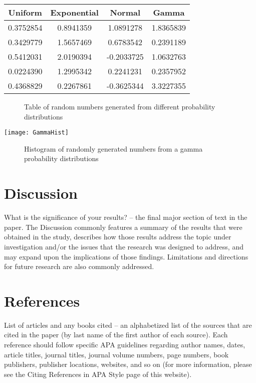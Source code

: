 \documentclass[12pt, letterpaper, twoside]{article}
\begin{document}
\begin{center}
\begin{tabular}{||c c c c||} 
 \hline
 Uniform & Exponential & Normal & Gamma \\ [0.5ex] 
 \hline\hline
 0.3752854 & 0.8941359 & 1.0891278 & 1.8365839 \\ 
 \hline
 0.3429779 & 1.5657469 & 0.6783542 & 0.2391189 \\
 \hline
 0.5412031 & 2.0190394 & -0.2033725 & 1.0632763 \\
 \hline
 0.0224390 & 1.2995342 & 0.2241231 & 0.2357952 \\
 \hline
 0.4368829 & 0.2267861 & -0.3625344 & 3.3227355 \\ [1ex] 
 \hline
\end{tabular}
\end{center}

\begin{figure}[h]
  \centering
  \caption{Table of random numbers generated from different probability distributions}
  \label{fig:Random Variable Table}
\end{figure}

\texttt{[image: GammaHist]}

\begin{figure}[h]
  \centering
  \caption{Histogram of randomly generated numbers from a gamma probability distributions}
  \label{fig:Random Gamma Histogram}
\end{figure}

\section*{Discussion}
What is the significance of your results? – the final major section of
text in the paper.  The Discussion commonly features a summary of the
results that were obtained in the study, describes how those results
address the topic under investigation and/or the issues that the research
was designed to address, and may expand upon the implications of those
findings.  Limitations and directions for future research are also commonly
addressed.

\newpage

\section*{References}
List of articles and any books cited – an alphabetized list of the
sources that are cited in the paper (by last name of the first author of
each source).  Each reference should follow specific APA guidelines
regarding author names, dates, article titles, journal titles, journal
volume numbers, page numbers, book publishers, publisher locations,
websites, and so on (for more information, please see the Citing References
in APA Style page of this website).
\end{document}
